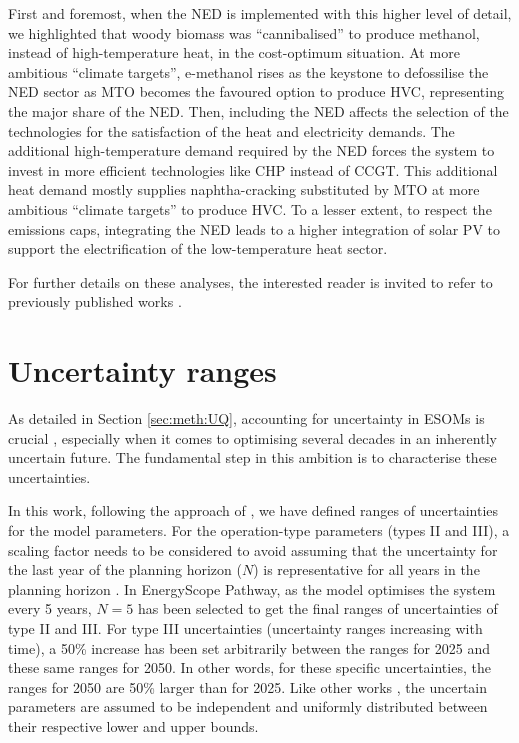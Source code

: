 First and foremost, when the \gls{NED} is implemented with this higher level of detail, we highlighted that woody biomass was ``cannibalised'' to produce methanol, instead of high-temperature heat, in the cost-optimum situation. At more ambitious ``climate targets'', e-methanol rises as the keystone to defossilise the \gls{NED} sector as \gls{MTO} becomes the favoured option to produce \gls{HVC}, representing the major share of the \gls{NED}. Then, including the \gls{NED} affects the selection of the technologies for the satisfaction of the heat and electricity demands. The additional high-temperature demand required by the \gls{NED} forces the system to invest in more efficient technologies like \gls{CHP} instead of \gls{CCGT}. This additional heat demand mostly supplies naphtha-cracking substituted by \gls{MTO} at more ambitious ``climate targets'' to produce \gls{HVC}. To a lesser extent, to respect the emissions caps, integrating the \gls{NED} leads to a higher integration of solar \gls{PV} to support the electrification of the low-temperature heat sector.


For further details on these analyses, the interested reader is invited to refer to previously published works \cite{rixhon2021comprehensive,rixhon2022integration}.

\section{Uncertainty ranges}
\label{sec:cs:uncertainty}
As detailed in Section \ref{sec:meth:UQ}, accounting for uncertainty in \gls{ESOMs} is crucial \cite{mavromatidis2018uncertainty}, especially when it comes to optimising several decades in an inherently uncertain future. The fundamental step in this ambition is to characterise these uncertainties. 

In this work, following the approach of \citet{Moret2017PhDThesis}, we have defined ranges of uncertainties for the model parameters.  For the operation-type parameters (types II and III), a scaling factor needs to be considered to avoid assuming that the uncertainty for the last year of the planning horizon ($N$) is representative for all years in the planning horizon \citet{Moret2017PhDThesis}. In EnergyScope Pathway, as the model optimises the system every 5 years, $N=5$ has been selected to get the final ranges of uncertainties of type II and III. For type III uncertainties (\ie uncertainty ranges increasing with time), a 50\% increase has been set arbitrarily between the ranges for 2025 and these same ranges for 2050. In other words, for these specific uncertainties, the ranges for 2050 are 50\% larger than for 2025. Like other works \cite{li2019renewables,coppitters2021robust}, the uncertain parameters are assumed to be independent and uniformly distributed between their respective lower and upper bounds. 

